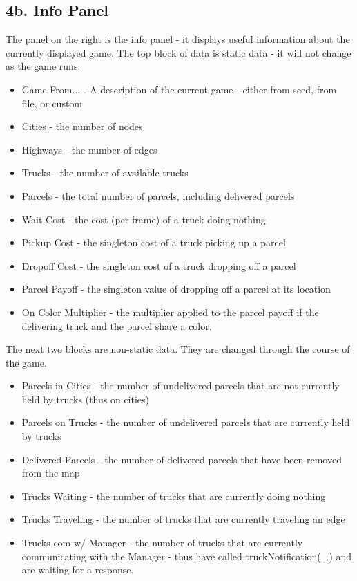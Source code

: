 \documentclass[11pt]{article}
\begin{document}
\subsection{4b. Info Panel}
The panel on the right is the info panel - it displays useful information about the currently displayed game.
The top block of data is static data - it will not change as the game runs.
\begin{itemize}
\item Game From... - A description of the current game - either from seed, from file, or custom
\item Cities - the number of nodes
\item Highways - the number of edges
\item Trucks - the number of available trucks
\item Parcels - the total number of parcels, including delivered parcels
\item Wait Cost - the cost (per frame) of a truck doing nothing
\item Pickup Cost - the singleton cost of a truck picking up a parcel
\item Dropoff Cost - the singleton cost of a truck dropping off a parcel
\item Parcel Payoff - the singleton value of dropping off a parcel at its location
\item On Color Multiplier - the multiplier applied to the parcel payoff if the delivering truck and the parcel share a color.
\end{itemize}

The next two blocks are non-static data. They are changed through the course of the game.
\begin{itemize}
\item Parcels in Cities - the number of undelivered parcels that are not currently held by trucks (thus on cities)
\item Parcels on Trucks - the number of undelivered parcels that are currently held by trucks
\item Delivered Parcels - the number of delivered parcels that have been removed from the map
\item Trucks Waiting - the number of trucks that are currently doing nothing
\item Trucks Traveling - the number of trucks that are currently traveling an edge
\item Trucks com w/ Manager - the number of trucks that are currently communicating with the Manager - thus have called truckNotification(...) and are waiting for a response.
\end{itemize}
\end{document}
